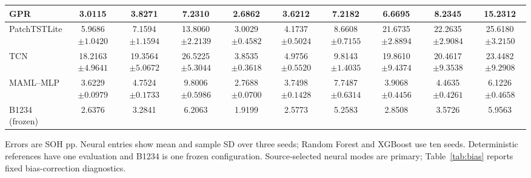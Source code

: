 \begin{table}[!htbp]
\begin{tabular}{l*{9}{c}}
GPR & 3.0115 & 3.8271 & 7.2310  & 2.6862 & 3.6212 & 7.2182  & 6.6695 & 8.2345 & 15.2312  \\
\midrule
PatchTSTLite & \shortstack{5.9686\\$\pm1.0420$} & \shortstack{7.1594\\$\pm1.1594$} & \shortstack{13.8060\\$\pm2.2139$} & \shortstack{3.0029\\$\pm0.4582$} & \shortstack{4.1737\\$\pm0.5024$} & \shortstack{8.6608\\$\pm0.7155$} & \shortstack{21.6735\\$\pm2.8894$} & \shortstack{22.2635\\$\pm2.9084$} & \shortstack{25.6180\\$\pm3.2150$} \\
TCN & \shortstack{18.2163\\$\pm4.9641$} & \shortstack{19.3564\\$\pm5.0672$} & \shortstack{26.5225\\$\pm5.3044$} & \shortstack{3.8535\\$\pm0.3618$} & \shortstack{4.9756\\$\pm0.5520$} & \shortstack{9.8143\\$\pm1.4035$} & \shortstack{19.8610\\$\pm9.4374$} & \shortstack{20.4617\\$\pm9.3538$} & \shortstack{23.4482\\$\pm9.2908$} \\
MAML--MLP & \shortstack{3.6229\\$\pm0.0979$} & \shortstack{4.7524\\$\pm0.1733$} & \shortstack{9.8006\\$\pm0.5986$} & \shortstack{2.7688\\$\pm0.0700$} & \shortstack{3.7498\\$\pm0.1428$} & \shortstack{7.7487\\$\pm0.6314$} & \shortstack{3.9068\\$\pm0.4456$} & \shortstack{4.4635\\$\pm0.4261$} & \shortstack{6.1226\\$\pm0.4658$} \\
\midrule
\rowcolor{gray!12}
B1234 (frozen) & 2.6376 & 3.2841 & 6.2063  & 1.9199 & 2.5773 & 5.2583  & 2.8508 & 3.5726 & 5.9563  \\
\bottomrule\end{tabular}
\par\smallskip\begin{minipage}{\columnwidth}\papertablesize Errors are SOH pp. Neural entries show mean and sample SD over three seeds; Random Forest and XGBoost use ten seeds. Deterministic references have one evaluation and B1234 is one frozen configuration. Source-selected neural modes are primary; Table~\ref{tab:bias} reports fixed bias-correction diagnostics.\end{minipage}
\end{table}
